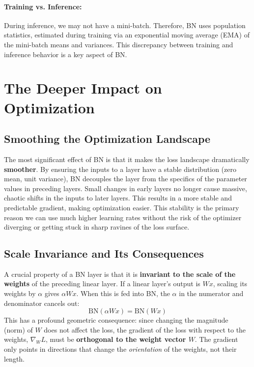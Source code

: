 \documentclass{article}
\begin{document}
\paragraph{Training vs. Inference:} During inference, we may not have a mini-batch. Therefore, BN uses population statistics, estimated during training via an exponential moving average (EMA) of the mini-batch means and variances. This discrepancy between training and inference behavior is a key aspect of BN.

\section{The Deeper Impact on Optimization}

\subsection{Smoothing the Optimization Landscape}
The most significant effect of BN is that it makes the loss landscape dramatically \textbf{smoother}. By ensuring the inputs to a layer have a stable distribution (zero mean, unit variance), BN decouples the layer from the specifics of the parameter values in preceding layers. Small changes in early layers no longer cause massive, chaotic shifts in the inputs to later layers. This results in a more stable and predictable gradient, making optimization easier. This stability is the primary reason we can use much higher learning rates without the risk of the optimizer diverging or getting stuck in sharp ravines of the loss surface.

\subsection{Scale Invariance and Its Consequences}
A crucial property of a BN layer is that it is \textbf{invariant to the scale of the weights} of the preceding linear layer. If a linear layer's output is $Wx$, scaling its weights by $\alpha$ gives $\alpha Wx$. When this is fed into BN, the $\alpha$ in the numerator and denominator cancels out:
$$ \text{BN}(\alpha Wx) = \text{BN}(Wx) $$
This has a profound geometric consequence: since changing the magnitude (norm) of $W$ does not affect the loss, the gradient of the loss with respect to the weights, $\nabla_W L$, must be \textbf{orthogonal to the weight vector $W$}. The gradient only points in directions that change the \textit{orientation} of the weights, not their length.
\end{document}
